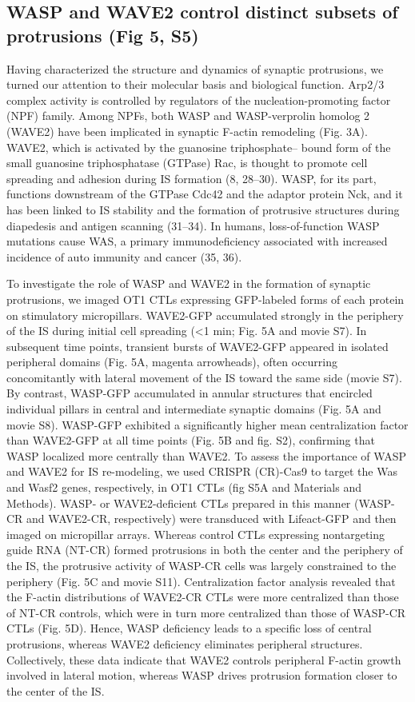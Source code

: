\subsection{WASP and WAVE2 control distinct subsets of protrusions (Fig 5, S5)}
Having characterized the structure and dynamics of synaptic protrusions, we turned our attention to their molecular basis and biological function. Arp2/3 complex activity is controlled by regulators of the nucleation-promoting factor (NPF) family. Among NPFs, both WASP and WASP-verprolin homolog 2 (WAVE2) have been implicated in synaptic F-actin remodeling (Fig. 3A). WAVE2, which is activated by the guanosine triphosphate– bound form of the small guanosine triphosphatase (GTPase) Rac, is thought to promote cell spreading and adhesion during IS formation (8, 28–30). WASP, for its part, functions downstream of the GTPase Cdc42 and the adaptor protein Nck, and it has been linked to IS stability and the formation of protrusive structures during diapedesis and antigen scanning (31–34). In humans, loss-of-function WASP mutations cause WAS, a primary immunodeficiency associated with increased incidence of auto immunity and cancer (35, 36).

To investigate the role of WASP and WAVE2 in the formation of synaptic protrusions, we imaged OT1 CTLs expressing GFP-labeled forms of each protein on stimulatory micropillars. WAVE2-GFP accumulated strongly in the periphery of the IS during initial cell spreading (<1 min; Fig. 5A and movie S7). In subsequent time points, transient bursts of WAVE2-GFP appeared in isolated peripheral domains (Fig. 5A, magenta arrowheads), often occurring concomitantly with lateral movement of the IS toward the same side (movie S7). By contrast, WASP-GFP accumulated in annular structures that encircled individual pillars in central and intermediate synaptic domains (Fig. 5A and movie S8). WASP-GFP exhibited a significantly higher mean centralization factor than WAVE2-GFP at all time points (Fig. 5B and fig. S2), confirming that WASP localized more centrally than WAVE2. To assess the importance of WASP and WAVE2 for IS re-modeling, we used CRISPR (CR)-Cas9 to target the Was and Wasf2 genes, respectively, in OT1 CTLs (fig S5A and Materials and Methods). WASP- or WAVE2-deficient CTLs prepared in this manner (WASP-CR and WAVE2-CR, respectively) were transduced with Lifeact-GFP and then imaged on micropillar arrays. Whereas control CTLs expressing nontargeting guide RNA (NT-CR) formed protrusions in both the center and the periphery of the IS, the protrusive activity of WASP-CR cells was largely constrained to the periphery (Fig. 5C and movie S11). Centralization factor analysis revealed that the F-actin distributions of WAVE2-CR CTLs were more centralized than those of NT-CR controls, which were in turn more centralized than those of WASP-CR CTLs (Fig. 5D). Hence, WASP deficiency leads to a specific loss of central protrusions, whereas WAVE2 deficiency eliminates peripheral structures. Collectively, these data indicate that WAVE2 controls peripheral F-actin growth involved in lateral motion, whereas WASP drives protrusion formation closer to the center of the IS.

